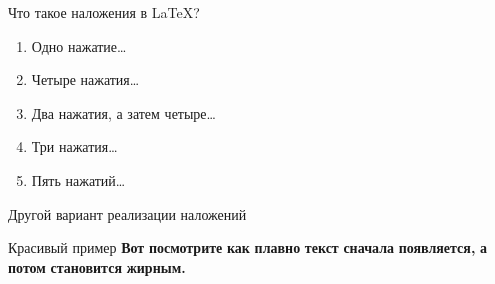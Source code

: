 \documentclass[10pt, hideallsections]{beamer}
\begin{document}
    \begin{frame}{Что такое наложения в LaTeX?}
        \begin{enumerate}
            \item <1-> Одно нажатие\dots %
            \item <4-> Четыре нажатия\dots %
            \item <2, 4-> Два нажатия, а затем четыре\dots %
            \item <3-> Три нажатия\dots %
            \item <5-> Пять нажатий\dots %
        \end{enumerate}
    \end{frame}


    \begin{frame}{Другой вариант реализации наложений}
        \begin{block}{Красивый пример}
            \textbf <2-> {Вот} \pause
            \textbf <3-> {посмотрите} \pause
            \textbf <4-> {как} \pause
            \textbf <5-> {плавно} \pause
            \textbf <6-> {текст} \pause
            \textbf <7-> {сначала} \pause
            \textbf <8-> {появляется,} \pause
            \textbf <9-> {а} \pause
            \textbf <10-> {потом} \pause
            \textbf <11-> {становится} \pause
            \textbf <12-> {жирным.}
        \end{block}
    \end{frame}
\end{document}
